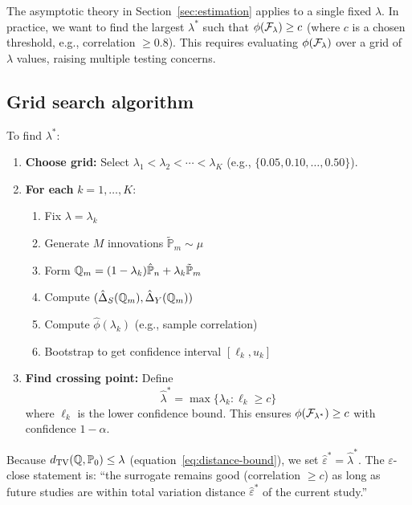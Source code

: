 \documentclass{article}
\newcommand{\PP}{\mathbb{P}}
\begin{document}
The asymptotic theory in Section~\ref{sec:estimation} applies to a single fixed
$\lambda$. In practice, we want to find the largest $\lambda^*$ such that
$\phi(\mathcal{F}_\lambda) \geq c$ (where $c$ is a chosen threshold, e.g., correlation
$\geq 0.8$). This requires evaluating $\phi(\mathcal{F}_\lambda)$ over a grid of $\lambda$
values, raising multiple testing concerns.

\subsection{Grid search algorithm}

To find $\lambda^*$:

\begin{enumerate}
    \item \textbf{Choose grid:} Select $\lambda_1 < \lambda_2 < \cdots < \lambda_K$
          (e.g., $\{0.05, 0.10, \ldots, 0.50\}$).

    \item \textbf{For each} $k = 1, \ldots, K$:
          \begin{enumerate}
              \item Fix $\lambda = \lambda_k$
              \item Generate $M$ innovations $\tilde{\PP}_m \sim \mu$
              \item Form $\Q_m = (1-\lambda_k)\hat{\PP}_n + \lambda_k\tilde{\PP}_m$
              \item Compute $(\hat{\Delta}_S(\mathbb{Q}_m), \hat{\Delta}_Y(\mathbb{Q}_m))$
              \item Compute $\hat{\phi}(\lambda_k)$ (e.g., sample correlation)
              \item Bootstrap to get confidence interval $[\ell_k, u_k]$
          \end{enumerate}

    \item \textbf{Find crossing point:} Define
          \[
              \hat{\lambda}^* = \max\{\lambda_k : \ell_k \geq c\}
          \]
          where $\ell_k$ is the lower confidence bound. This ensures
          $\phi(\mathcal{F}_{\lambda^*}) \geq c$ with confidence $1-\alpha$.
\end{enumerate}

Because $d_{\mathrm{TV}}(\Q, \PP_0) \leq \lambda$ (equation~\eqref{eq:distance-bound}),
we set $\hat{\varepsilon}^* = \hat{\lambda}^*$. The $\varepsilon$-close statement is:
``the surrogate remains good (correlation $\geq c$) as long as future studies are
within total variation distance $\hat{\varepsilon}^*$ of the current study.''
\end{document}
